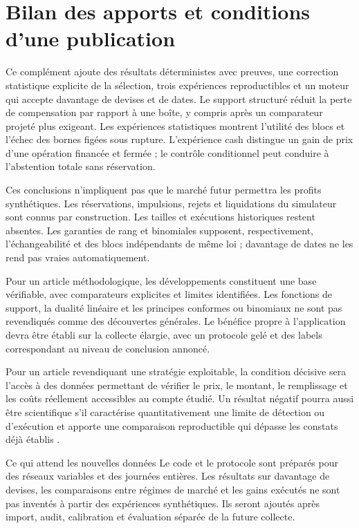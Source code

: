 \section{Bilan des apports et conditions d'une publication}
\label{sec:ext-bilan}

Ce complément ajoute des résultats déterministes avec preuves, une correction statistique explicite de la sélection, trois expériences reproductibles et un moteur qui accepte davantage de devises et de dates. Le support structuré réduit la perte de compensation par rapport à une boîte, y compris après un comparateur projeté plus exigeant. Les expériences statistiques montrent l'utilité des blocs et l'échec des bornes figées sous rupture. L'expérience cash distingue un gain de prix d'une opération financée et fermée ; le contrôle conditionnel peut conduire à l'abstention totale sans réservation.

Ces conclusions n'impliquent pas que le marché futur permettra les profits synthétiques. Les réservations, impulsions, rejets et liquidations du simulateur sont connus par construction. Les tailles et exécutions historiques restent absentes. Les garanties de rang et binomiales supposent, respectivement, l'échangeabilité et des blocs indépendants de même loi ; davantage de dates ne les rend pas vraies automatiquement.

Pour un article méthodologique, les développements constituent une base vérifiable, avec comparateurs explicites et limites identifiées. Les fonctions de support, la dualité linéaire et les principes conformes ou binomiaux ne sont pas revendiqués comme des découvertes générales. Le bénéfice propre à l'application devra être établi sur la collecte élargie, avec un protocole gelé et des labels correspondant au niveau de conclusion annoncé.

Pour un article revendiquant une stratégie exploitable, la condition décisive sera l'accès à des données permettant de vérifier le prix, le montant, le remplissage et les coûts réellement accessibles au compte étudié. Un résultat négatif pourra aussi être scientifique s'il caractérise quantitativement une limite de détection ou d'exécution et apporte une comparaison reproductible qui dépasse les constats déjà établis \cite{fenn,ito,ext-liquidity}.

\begin{callout}{Ce qui attend les nouvelles données}
Le code et le protocole sont préparés pour des réseaux variables et des journées entières. Les résultats sur davantage de devises, les comparaisons entre régimes de marché et les gains exécutés ne sont pas inventés à partir des expériences synthétiques. Ils seront ajoutés après import, audit, calibration et évaluation séparée de la future collecte.
\end{callout}

